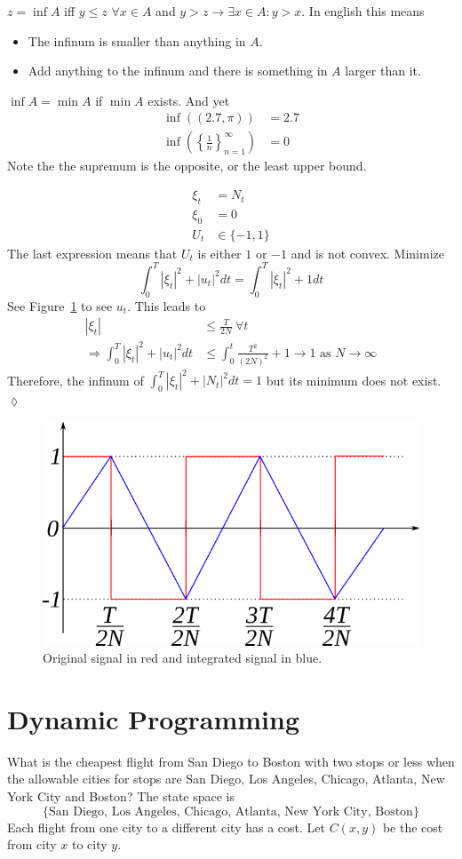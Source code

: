 $z = \inf A$ iff $y\leq z$ $\forall x\in A$ and $y>z\to\exists x\in A: y>x$.
In english this means
\begin{itemize}
\item The infinum is smaller than anything in $A$.
\item Add anything to the infinum and there is something in $A$ larger than it.
\end{itemize}
$\inf A = \min A$ if $\min A$ exists.
And yet
\begin{align*}
\inf((2.7,\pi)) &= 2.7 \\
\inf\left(\left\lbrace\frac{1}{n}\right\rbrace_{n=1}^\infty\right) &= 0
\end{align*}
Note the the supremum is the opposite, or the least upper bound.

\begin{example}
\begin{align*}
\xi_t &= N_t \\
\xi_0 &= 0 \\
U_t&\in\{-1,1\}
\end{align*}
The last expression means that $U_t$ is either $1$ or $-1$ and is not convex.
Minimize
$$\int_0^T|\xi_t|^2 + |u_t|^2dt = \int_0^T|\xi_t|^2 + 1dt$$
See Figure~\ref{fig:04signal} to see $u_t$.
This leads to
\begin{align*}
|\xi_t| &\leq \frac{T}{2N}~\forall t \\
\Rightarrow \int_0^T|\xi_t|^2+|u_t|^2dt &\leq \int_0^t\frac{T^2}{{(2N)}^2} + 1 \to 1 \text{~as~} N\to\infty
\end{align*}
Therefore, the infinum of $\int_0^T|\xi_t|^2+|N_t|^2dt = 1$ but its minimum does not exist.
$\lozenge$
\end{example}

\begin{figure}[ht!]
\centering
\includegraphics[width=.4\textwidth]{images/04signal}
\caption{Original signal in red and integrated signal in blue.}
\label{fig:04signal}
\end{figure}

\section{Dynamic Programming}
What is the cheapest flight from San Diego to Boston with two stops or less when the allowable cities for stops are San Diego, Los Angeles, Chicago, Atlanta, New York City and Boston?
The state space is
$$\{\text{San Diego,~Los~Angeles,~Chicago,~Atlanta,~New~York~City,~Boston}\}$$
Each flight from one city to a different city has a cost.
Let $C(x,y)$ be the cost from city $x$ to city $y$.

